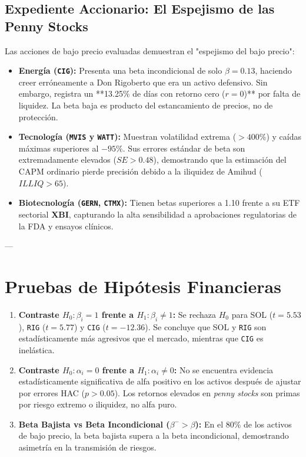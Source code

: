 \documentclass[11pt,a4paper]{article}
\begin{document}
\subsection{Expediente Accionario: El Espejismo de las Penny Stocks}
Las acciones de bajo precio evaluadas demuestran el "espejismo del bajo precio":
\begin{itemize}
    \item \textbf{Energía (\texttt{CIG}):} Presenta una beta incondicional de solo $\beta = 0.13$, haciendo creer erróneamente a Don Rigoberto que era un activo defensivo. Sin embargo, registra un **13.25\% de días con retorno cero ($r=0$)** por falta de liquidez. La beta baja es producto del estancamiento de precios, no de protección.
    \item \textbf{Tecnología (\texttt{MVIS} y \texttt{WATT}):} Muestran volatilidad extrema ($>400\%$) y caídas máximas superiores al $-95\%$. Sus errores estándar de beta son extremadamente elevados ($SE > 0.48$), demostrando que la estimación del CAPM ordinario pierde precisión debido a la iliquidez de Amihud ($ILLIQ > 65$).
    \item \textbf{Biotecnología (\texttt{GERN}, \texttt{CTMX}):} Tienen betas superiores a 1.10 frente a su ETF sectorial \textbf{XBI}, capturando la alta sensibilidad a aprobaciones regulatorias de la FDA y ensayos clínicos.
\end{itemize}

---

\section{Pruebas de Hipótesis Financieras}

\begin{enumerate}
    \item \textbf{Contraste $H_0: \beta_i = 1$ frente a $H_1: \beta_i \neq 1$:}  
    Se rechaza $H_0$ para SOL ($t = 5.53$), \texttt{RIG} ($t = 5.77$) y \texttt{CIG} ($t = -12.36$). Se concluye que SOL y \texttt{RIG} son estadísticamente más agresivos que el mercado, mientras que \texttt{CIG} es inelástica.
    \item \textbf{Contraste $H_0: \alpha_i = 0$ frente a $H_1: \alpha_i \neq 0$:}  
    No se encuentra evidencia estadísticamente significativa de alfa positivo en los activos después de ajustar por errores HAC ($p > 0.05$). Los retornos elevados en \textit{penny stocks} son primas por riesgo extremo o iliquidez, no alfa puro.
    \item \textbf{Beta Bajista vs Beta Incondicional ($\beta^- > \beta$):}  
    En el 80\% de los activos de bajo precio, la beta bajista supera a la beta incondicional, demostrando asimetría en la transmisión de riesgos.
\end{enumerate}
\end{document}
